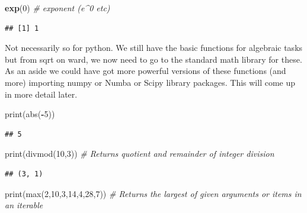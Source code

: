 \documentclass[]{book}
\newenvironment{Shaded}{\begin{snugshade}}{\end{snugshade}}
\newcommand{\KeywordTok}[1]{\textcolor[rgb]{0.13,0.29,0.53}{\textbf{#1}}}
\newcommand{\DecValTok}[1]{\textcolor[rgb]{0.00,0.00,0.81}{#1}}
\newcommand{\CommentTok}[1]{\textcolor[rgb]{0.56,0.35,0.01}{\textit{#1}}}
\newcommand{\OperatorTok}[1]{\textcolor[rgb]{0.81,0.36,0.00}{\textbf{#1}}}
\newcommand{\BuiltInTok}[1]{#1}
\newcommand{\NormalTok}[1]{#1}
\theoremstyle{definition}
\theoremstyle{definition}
\theoremstyle{definition}
\theoremstyle{remark}
\begin{document}
\begin{Shaded}
\begin{Highlighting}[]
\KeywordTok{exp}\NormalTok{(}\DecValTok{0}\NormalTok{)           }\CommentTok{# exponent (e^0 etc)}
\end{Highlighting}
\end{Shaded}

\begin{verbatim}
## [1] 1
\end{verbatim}

Not necessarily so for python. We still have the basic functions for
algebraic tasks but from sqrt on ward, we now need to go to the standard
math library for these. As an aside we could have got more powerful
versions of these functions (and more) importing numpy  or
Numba  or Scipy  library packages. This will
come up in more detail later.

\begin{Shaded}
\begin{Highlighting}[]
\BuiltInTok{print}\NormalTok{(}\BuiltInTok{abs}\NormalTok{(}\OperatorTok{-}\DecValTok{5}\NormalTok{))}
\end{Highlighting}
\end{Shaded}

\begin{verbatim}
## 5
\end{verbatim}

\begin{Shaded}
\begin{Highlighting}[]
\BuiltInTok{print}\NormalTok{(}\BuiltInTok{divmod}\NormalTok{(}\DecValTok{10}\NormalTok{,}\DecValTok{3}\NormalTok{))             }\CommentTok{# Returns quotient and remainder of integer division}
\end{Highlighting}
\end{Shaded}

\begin{verbatim}
## (3, 1)
\end{verbatim}

\begin{Shaded}
\begin{Highlighting}[]
\BuiltInTok{print}\NormalTok{(}\BuiltInTok{max}\NormalTok{(}\DecValTok{2}\NormalTok{,}\DecValTok{10}\NormalTok{,}\DecValTok{3}\NormalTok{,}\DecValTok{14}\NormalTok{,}\DecValTok{4}\NormalTok{,}\DecValTok{28}\NormalTok{,}\DecValTok{7}\NormalTok{))    }\CommentTok{# Returns the largest of given arguments or items in an iterable}
\end{Highlighting}
\end{Shaded}
\end{document}
